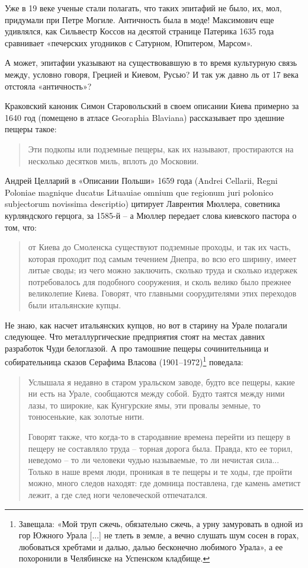 Уже в 19 веке ученые стали полагать, что таких эпитафий не было, их, мол, придумали при Петре Могиле. Античность была в моде! Максимович еще удивлялся, как Сильвестр Коссов на десятой странице Патерика 1635 года сравнивает «печерских угодников с Сатурном, Юпитером, Марсом».

А может, эпитафии указывают на существовавшую в то время культурную связь между, условно говоря, Грецией и Киевом, Русью? И так уж давно ль от 17 века отстояла «античность»?

Краковский каноник Симон Старовольский в своем описании Киева примерно за 1640 год (помещено в атласе Georaphia Blaviana) рассказывает про здешние пещеры такое:

\begin{quotation}  
Эти подкопы или подземные пещеры, как их называют, простираются на несколько десятков миль, вплоть до Московии.
\end{quotation}  

Андрей Целларий в «Описании Польши» 1659 года (Andrei Cellarii, Regni Poloniae magnique ducatus Lituauiae omnium que regionum juri polonico subjectorum novissima descriptio) цитирует Лаврентия Мюллера, советника курляндского герцога, за 1585-й – а Мюллер передает слова киевского пастора о том, что:

\begin{quotation}
от Киева до Смоленска существуют подземные проходы, и так их часть, которая проходит под самым течением Днепра, во всю его ширину, имеет литые своды; из чего можно заключить, сколько труда и сколько издержек потребовалось для подобного сооружения, и сколь велико было прежнее великолепие Киева. Говорят, что главными соорудителями этих переходов были итальянские купцы.
\end{quotation}

Не знаю, как насчет итальянских купцов, но вот в старину на Урале полагали следующее. Что металлургические предприятия стоят на местах давних разработок Чуди белоглазой. А про тамошние пещеры сочинительница и собирательница сказов Серафима Власова (1901–1972)\footnote{Завещала: «Мой труп сжечь, обязательно сжечь, а урну замуровать в одной из гор Южного Урала [...] не тлеть в земле, а вечно слушать шум сосен в горах, любоваться хребтами и далью, далью бесконечно любимого Урала», а ее похоронили в Челябинске на Успенском кладбище.} поведала:

\begin{quotation}
Услышала я недавно в старом уральском заводе, будто все пещеры, какие ни есть на Урале, сообщаются между собой. Будто таятся между ними лазы, то широкие, как Кунгурские ямы, эти провалы земные, то тонюсенькие, как золотые нити. 

Говорят также, что когда-то в стародавние времена перейти из пещеру в пещеру не составляло труда – торная дорога была. Правда, кто ее торил, неведомо – то ли человеки чудью называемые, то ли нечистая сила... Только в наше время люди, проникая в те пещеры и те ходы, где пройти можно, много следов находят: где домница поставлена, где камень аметист лежит, а где след ноги человеческой отпечатался.
\end{quotation}

